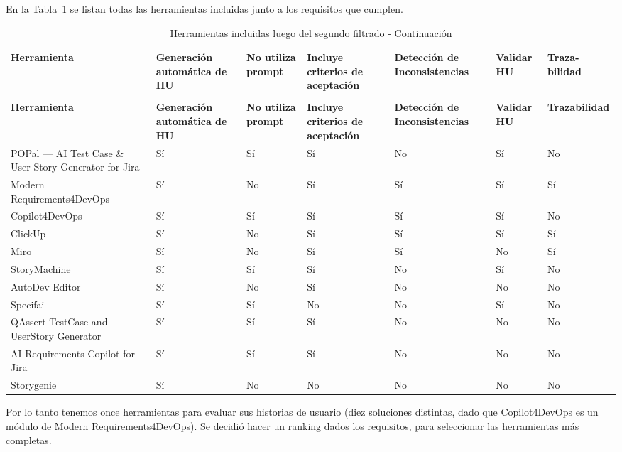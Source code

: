 En la Tabla~\ref{tab:incluidasfiltrado2} se listan todas las herramientas incluidas junto a los requisitos que cumplen.

\begin{longtable}{|p{2.5cm}|p{1.9cm}|p{1.2cm}|p{1.9cm}|p{2cm}|p{1.2cm}|p{1cm}|}
\caption{Herramientas incluidas luego del segundo filtrado} 
\label{tab:incluidasfiltrado2} \\
\hline
\textbf{Herramienta} &
\textbf{Generación automática de HU} &
\textbf{No utiliza prompt} &
\textbf{Incluye criterios de aceptación} &
\textbf{Detección de Inconsistencias} &
\textbf{Validar HU} &
\textbf{Traza- bilidad} \\
\hline
\endfirsthead

\caption{Herramientas incluidas luego del segundo filtrado - Continuación} \\
\hline
\textbf{Herramienta} &
\textbf{Generación automática de HU} &
\textbf{No utiliza prompt} &
\textbf{Incluye criterios de aceptación} &
\textbf{Detección de Inconsistencias} &
\textbf{Validar HU} &
\textbf{Trazabilidad} \\
\hline
\endhead

\hline
\endfoot

\hline
\endlastfoot

POPal --- AI Test Case \& User Story Generator for Jira & Sí & Sí & Sí & No & Sí & No \\
Modern Requirements4DevOps & Sí & No & Sí & Sí & Sí & Sí \\
Copilot4DevOps & Sí & Sí & Sí & Sí & Sí & No \\
ClickUp & Sí & No & Sí & Sí & Sí & Sí \\
Miro & Sí & No & Sí & Sí & No & Sí \\
StoryMachine & Sí & Sí & Sí & No & Sí & No \\
AutoDev Editor & Sí & No & Sí & No & No & No \\
Specifai & Sí & Sí & No & No & Sí & No \\
QAssert TestCase and UserStory Generator & Sí & Sí & Sí & No & No & No \\
AI Requirements Copilot for Jira & Sí & Sí & Sí & No & No & No \\
Storygenie & Sí & No & No & No & No & No \\
\end{longtable}

Por lo tanto tenemos once herramientas para evaluar sus historias de usuario (diez soluciones distintas, dado que Copilot4DevOps es un módulo de Modern Requirements4DevOps). Se decidió hacer un ranking dados los requisitos, para seleccionar las herramientas más completas.


